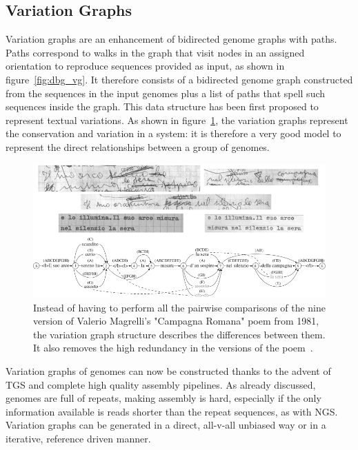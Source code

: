 \subsection{Variation Graphs}
Variation graphs are an enhancement of bidirected genome graphs with paths. Paths correspond to walks in the graph that visit nodes in an assigned orientation to reproduce sequences provided as input, as shown in figure~\ref{fig:dbg_vg}. It therefore consists of a bidirected genome graph constructed from the sequences in the input genomes plus a list of paths that spell such sequences inside the graph.
This data structure has been first proposed to represent textual variations. As shown in figure~\ref{fig:campagna_romana}, the variation graphs represent the conservation and variation in a system: it is therefore a very good model to represent the direct relationships between a group of genomes.
\begin{figure}[h!]
	\centering
	\includegraphics[width=.95\linewidth]{figures/background/variant_graph.jpg}
	\caption[The Variation Graph origin.]{Instead of having to perform all the pairwise comparisons of the nine version of Valerio Magrelli's "Campagna Romana" poem from 1981, the variation graph structure describes the differences between them. It also removes the high redundancy in the versions of the poem~\cite{variant_graph,garrison_pangenome}.}
	\label{fig:campagna_romana}
\end{figure}
Variation graphs of genomes can now be constructed thanks to the advent of TGS and complete high quality assembly pipelines. As already discussed, genomes are full of repeats, making assembly is hard, especially if the only information available is reads shorter than the repeat sequences, as with NGS.\\
Variation graphs can be generated in a direct, all-v-all unbiased way or in a iterative, reference driven manner.



